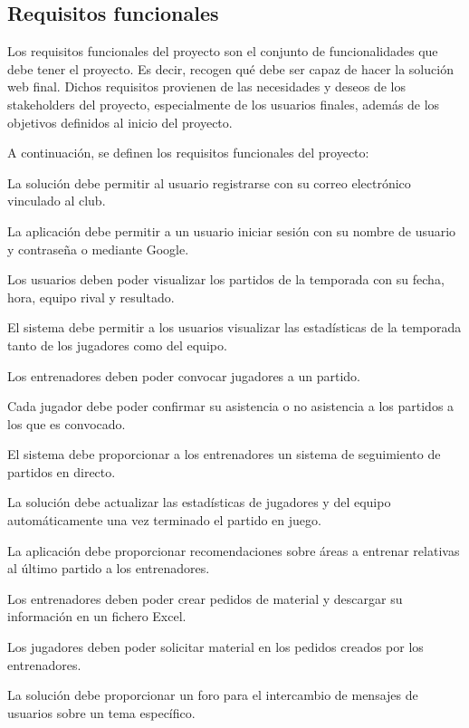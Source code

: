 \subsection{Requisitos funcionales}

Los requisitos funcionales del proyecto son el conjunto de funcionalidades que debe tener el proyecto. Es decir, recogen qué debe ser capaz de hacer la solución web final. Dichos requisitos provienen de las necesidades y deseos de los stakeholders del proyecto, especialmente de los usuarios finales, además de los objetivos definidos al inicio del proyecto.

A continuación, se definen los requisitos funcionales del proyecto:

\begin{description}
  [labelindent=2em,
    leftmargin=!,
    labelwidth=1.5cm,
    labelsep=1em,
    font=\normalfont
  ]
  \item[RF-01] La solución debe permitir al usuario registrarse con su correo electrónico vinculado al club.
  \item[RF-02] La aplicación debe permitir a un usuario iniciar sesión con su nombre de usuario y contraseña o mediante Google.
  \item[RF-03] Los usuarios deben poder visualizar los partidos de la temporada con su fecha, hora, equipo rival y resultado.
  \item[RF-04] El sistema debe permitir a los usuarios visualizar las estadísticas de la temporada tanto de los jugadores como del equipo.
  \item[RF-05] Los entrenadores deben poder convocar jugadores a un partido.
  \item[RF-06] Cada jugador debe poder confirmar su asistencia o no asistencia a los partidos a los que es convocado.
  \item[RF-07] El sistema debe proporcionar a los entrenadores un sistema de seguimiento de partidos en directo.
  \item[RF-08] La solución debe actualizar las estadísticas de jugadores y del equipo automáticamente una vez terminado el partido en juego.
  \item[RF-09] La aplicación debe proporcionar recomendaciones sobre áreas a entrenar relativas al último partido a los entrenadores.
  \item[RF-10] Los entrenadores deben poder crear pedidos de material y descargar su información en un fichero Excel.
  \item[RF-11] Los jugadores deben poder solicitar material en los pedidos creados por los entrenadores.
  \item[RF-12] La solución debe proporcionar un foro para el intercambio de mensajes de usuarios sobre un tema específico.
\end{description}

